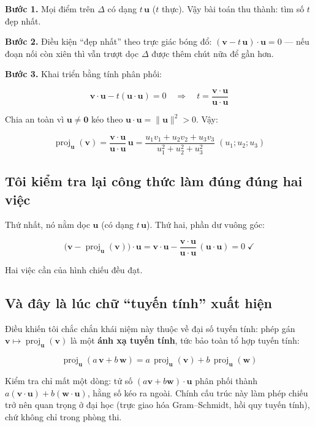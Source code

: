 \documentclass[12pt,a4paper]{article}
\begin{document}
\textbf{Bước 1.} Mọi điểm trên $\Delta$ có dạng $t\,\mathbf{u}$ ($t$ thực). Vậy bài toán thu thành: tìm số $t$ đẹp nhất.

\textbf{Bước 2.} Điều kiện ``đẹp nhất'' theo trực giác bóng đổ: $(\mathbf{v} - t\,\mathbf{u})\cdot\mathbf{u} = 0$ --- nếu đoạn nối còn xiên thì vẫn trượt dọc $\Delta$ được thêm chút nữa để gần hơn.

\textbf{Bước 3.} Khai triển bằng tính phân phối:

$$
\mathbf{v}\cdot\mathbf{u} - t(\mathbf{u}\cdot\mathbf{u}) = 0
\quad\Longrightarrow\quad
t = \frac{\mathbf{v}\cdot\mathbf{u}}{\mathbf{u}\cdot\mathbf{u}}
$$

Chia an toàn vì $\mathbf{u}\neq\mathbf{0}$ kéo theo $\mathbf{u}\cdot\mathbf{u}=\|\mathbf{u}\|^2>0$. Vậy:

$$
\boxed{\;\operatorname{proj}_{\mathbf{u}}(\mathbf{v}) = \frac{\mathbf{v} \cdot \mathbf{u}}{\mathbf{u} \cdot \mathbf{u}}\, \mathbf{u}
= \frac{u_1 v_1 + u_2 v_2 + u_3 v_3}{u_1^2 + u_2^2 + u_3^2}\;(u_1;u_2;u_3)\;}
$$

\subsection*{Tôi kiểm tra lại công thức làm đúng đúng hai việc}

Thứ nhất, nó nằm dọc $\mathbf{u}$ (có dạng $t\,\mathbf{u}$). Thứ hai, phần dư vuông góc:

$$
\bigl(\mathbf{v} - \operatorname{proj}_{\mathbf{u}}(\mathbf{v})\bigr)\cdot\mathbf{u}
= \mathbf{v}\cdot\mathbf{u} - \frac{\mathbf{v}\cdot\mathbf{u}}{\mathbf{u}\cdot\mathbf{u}}\,(\mathbf{u}\cdot\mathbf{u})
= 0 \;\checkmark
$$

Hai việc cần của hình chiếu đều đạt.

\subsection*{Và đây là lúc chữ ``tuyến tính'' xuất hiện}

Điều khiến tôi chắc chắn khái niệm này thuộc về đại số tuyến tính: phép gán $\mathbf{v} \mapsto \operatorname{proj}_{\mathbf{u}}(\mathbf{v})$ là một \textbf{ánh xạ tuyến tính}, tức bảo toàn tổ hợp tuyến tính:

$$
\operatorname{proj}_{\mathbf{u}}(a\,\mathbf{v} + b\,\mathbf{w})
= a\,\operatorname{proj}_{\mathbf{u}}(\mathbf{v}) + b\,\operatorname{proj}_{\mathbf{u}}(\mathbf{w})
$$

Kiểm tra chỉ mất một dòng: tử số $(a\mathbf{v}+b\mathbf{w})\cdot\mathbf{u}$ phân phối thành $a(\mathbf{v}\cdot\mathbf{u})+b(\mathbf{w}\cdot\mathbf{u})$, hằng số kéo ra ngoài. Chính cấu trúc này làm phép chiếu trở nên quan trọng ở đại học (trực giao hóa Gram--Schmidt, hồi quy tuyến tính), chứ không chỉ trong phòng thi.
\end{document}

